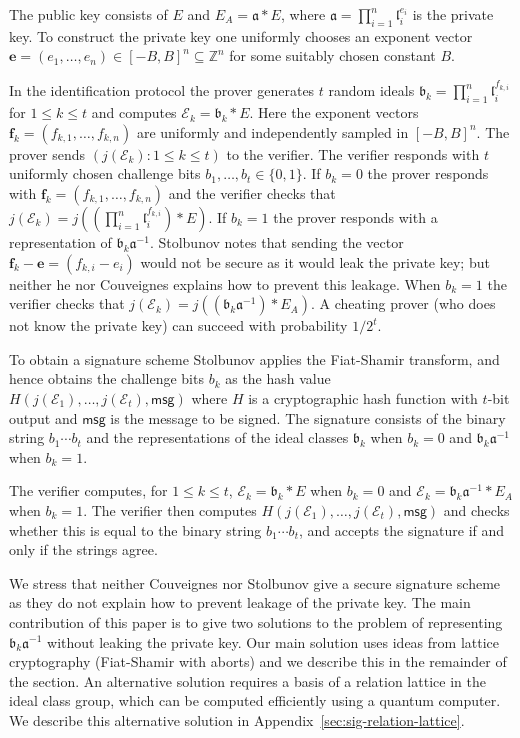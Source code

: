 \documentclass{llncs}
\newcommand{\E}{\mathcal{E}}
\newcommand{\Z}{\mathbb{Z}}
\newcommand{\msg}{\mathsf{msg}}
\renewcommand{\a}{\mathfrak{a}}
\renewcommand{\b}{\mathfrak{b}}
\renewcommand{\l}{\mathfrak{l}}
\newcommand{\e}{\mathbf{e}}
\newcommand{\f}{\mathbf{f}}
\begin{document}
The public key consists of $E$ and $E_A = \a * E$, where $\a = \prod_{i=1}^n \l_i^{e_i}$ is the private key.
To construct the private key one uniformly chooses an exponent vector $\e = (e_1, \dots, e_n) \in [-B,B]^n \subseteq \Z^n$ for some suitably chosen constant $B$.

In the identification protocol the prover generates $t$ random ideals $\b_k = \prod_{i=1}^n \l_i^{f_{k,i}}$ for $1 \le k \le t$ and computes $\E_k = \b_k * E$.
Here the exponent vectors $\f_k = ( f_{k,1}, \dots, f_{k,n} )$ are uniformly and independently sampled in $[-B,B]^n$.
The prover sends $(j( \E_k ) : 1 \le k \le t )$ to the verifier.
The verifier responds with $t$ uniformly chosen challenge bits $b_1, \dots, b_t \in \{0,1\}$.
If $b_k = 0$ the prover responds with $\f_k = ( f_{k,1}, \dots, f_{k,n} )$ and the verifier checks that $j(\E_k) = j( (\prod_{i=1}^n \l_i^{f_{k,i}}) * E )$.
If $b_k = 1$ the prover responds with a representation of $\b_k \a^{-1}$. Stolbunov notes that sending the vector $\f_k - \e = (f_{k,i} - e_i )$ would not be secure as it would leak the private key; but neither he nor Couveignes explains how to prevent this leakage.
When $b_k=1$ the verifier checks that $j(\E_k) = j( (\b_k \a^{-1}) * E_A )$.
A cheating prover (who does not know the private key) can succeed with probability $1/2^t$.

To obtain a signature scheme Stolbunov applies the Fiat-Shamir transform, and hence obtains the challenge bits $b_k$ as the hash value $H( j(\E_1), \dots, j(\E_t) , \msg )$ where $H$ is a cryptographic hash function with $t$-bit output and $\msg$ is the message to be signed.
The signature consists of the binary string $b_1\cdots b_t$ and the representations of the ideal classes $\b_k$ when $b_k = 0$ and $\b_k \a^{-1}$ when $b_k = 1$.

The verifier computes, for $1 \le k \le t$, $\E_k = \b_k * E$ when $b_k = 0$ and $\E_k = \b_k \a^{-1} * E_A$ when $b_k = 1$. The verifier then computes $H( j( \E_1), \dots, j(\E_t), \msg )$ and checks whether this is equal to the binary string $b_1\cdots b_t$, and accepts the signature if and only if the strings agree.


We stress that neither Couveignes nor Stolbunov give a secure signature scheme as they do not explain how to prevent leakage of the private key. The main contribution of this paper is to give two solutions to the problem of representing $\b_k \a^{-1}$ without leaking the private key.
Our main solution uses ideas from lattice cryptography (Fiat-Shamir with aborts) and we describe this in the remainder of the section.
An alternative solution requires a basis of a relation lattice in the ideal class group, which can be computed efficiently using a quantum computer. We describe this alternative solution in Appendix~\ref{sec:sig-relation-lattice}.
\end{document}
